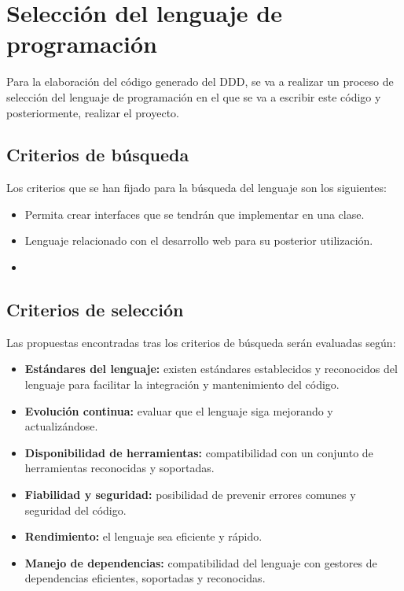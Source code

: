 \section{Selección del lenguaje de programación}

Para la elaboración del código generado del DDD, se va a realizar un proceso de selección del lenguaje de programación en el que se va a escribir este código y posteriormente, realizar el proyecto.

\subsection{Criterios de búsqueda}

Los criterios que se han fijado para la búsqueda del lenguaje son los siguientes:

\begin{itemize}
    \item Permita crear interfaces que se tendrán que implementar en una clase.
    \item Lenguaje relacionado con el desarrollo web para su posterior utilización.
    \item 
\end{itemize}

\subsection{Criterios de selección}

Las propuestas encontradas tras los criterios de búsqueda serán evaluadas según:

\begin{itemize}
    \item \textbf{Estándares del lenguaje:} existen estándares establecidos y reconocidos del lenguaje para facilitar la integración y mantenimiento del código.
    \item \textbf{Evolución continua:} evaluar que el lenguaje siga mejorando y actualizándose.
    \item \textbf{Disponibilidad de herramientas:} compatibilidad con un conjunto de herramientas reconocidas y soportadas.
    \item \textbf{Fiabilidad y seguridad:} posibilidad de prevenir errores comunes y seguridad del código.
    \item \textbf{Rendimiento:} el lenguaje sea eficiente y rápido.
    \item \textbf{Manejo de dependencias:} compatibilidad del lenguaje con gestores de dependencias eficientes, soportadas y reconocidas.
\end{itemize}

